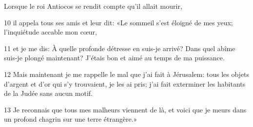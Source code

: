 Lorsque le roi Antiocos se rendit compte qu’il allait mourir,

10 il appela tous ses amis et leur dit: «Le sommeil s’est éloigné de mes yeux; l’inquiétude accable mon cœur,

11 et je me dis: À quelle profonde détresse en suis-je arrivé? Dans quel abîme suis-je plongé maintenant? J’étais bon et aimé au temps de ma puissance.

12 Mais maintenant je me rappelle le mal que j’ai fait à Jérusalem: tous les objets d’argent et d’or qui s’y trouvaient, je les ai pris; j’ai fait exterminer les habitants de la Judée sans aucun motif.

13 Je reconnais que tous mes malheurs viennent de là, et voici que je meurs dans un profond chagrin sur une terre étrangère.»
